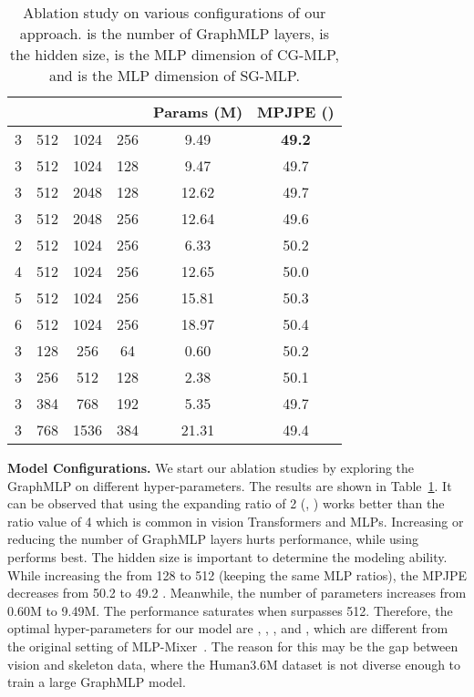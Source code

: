 \documentclass[lettersize,journal]{IEEEtran}
\begin{document}
\begin{table}[t]
  \centering
  \caption
  {
    Ablation study on various configurations of our approach. 
     is the number of GraphMLP layers,  is the hidden size,  is the MLP dimension of CG-MLP, and  is the MLP dimension of SG-MLP. 
  }
  \setlength{\tabcolsep}{3.10mm}
  \begin{tabular}{cccccc}
    \toprule
    & & & & Params (M) & MPJPE ()  \\
    \midrule
    3& 512& 1024& 256& 9.49& \textbf{49.2} \\
    \midrule

    3& 512& 1024& 128& 9.47& 49.7 \\
    3& 512& 2048& 128& 12.62& 49.7 \\
    3& 512& 2048& 256& 12.64& 49.6 \\

    \midrule  

    2& 512& 1024& 256& 6.33& 50.2 \\
    4& 512& 1024& 256& 12.65& 50.0 \\
    5& 512& 1024& 256& 15.81& 50.3 \\
    6& 512& 1024& 256& 18.97& 50.4 \\

    \midrule

    3& 128& 256& 64& 0.60& 50.2 \\
    3& 256& 512& 128& 2.38& 50.1 \\
    3& 384& 768& 192& 5.35& 49.7 \\
    3& 768& 1536& 384 & 21.31& 49.4 \\
\toprule
\end{tabular}
\label{table:parameters}
\end{table}

\noindent \textbf{Model Configurations.}
We start our ablation studies by exploring the GraphMLP on different hyper-parameters. 
The results are shown in Table~\ref{table:parameters}. 
It can be observed that using the expanding ratio of 2 (, ) works better than the ratio value of 4 which is common in vision Transformers and MLPs. 
Increasing or reducing the number of GraphMLP layers  hurts performance, while using  performs best. 
The hidden size  is important to determine the modeling ability. 
While increasing the  from 128 to 512 (keeping the same MLP ratios), the MPJPE decreases from 50.2  to 49.2 . 
Meanwhile, the number of parameters increases from 0.60M to 9.49M. 
The performance saturates when  surpasses 512. 
Therefore, the optimal hyper-parameters for our model are , , , and , which are different from the original setting of MLP-Mixer~\cite{mlpmixer}. 
The reason for this may be the gap between vision and skeleton data, where the Human3.6M dataset is not diverse enough to train a large GraphMLP model. 
\end{document}
